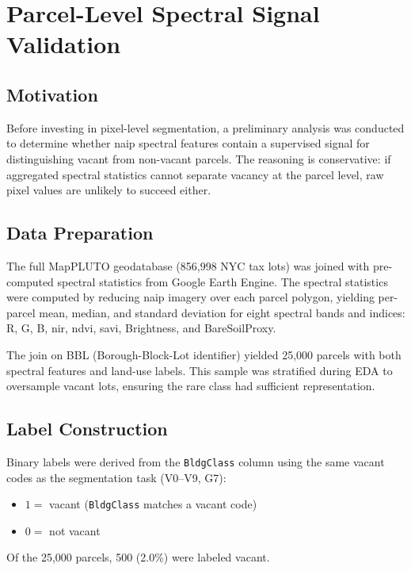 \chapter{Parcel-Level Spectral Signal Validation}
\label{appendix:spectral_signal}

\section{Motivation}

Before investing in pixel-level segmentation, a preliminary analysis was conducted to determine whether \acrshort{naip} spectral features contain a supervised signal for distinguishing vacant from non-vacant parcels. The reasoning is conservative: if aggregated spectral statistics cannot separate vacancy at the parcel level, raw pixel values are unlikely to succeed either.

\section{Data Preparation}

The full MapPLUTO geodatabase (856,998 NYC tax lots) was joined with pre-computed spectral statistics from Google Earth Engine. The spectral statistics were computed by reducing \acrshort{naip} imagery over each parcel polygon, yielding per-parcel mean, median, and standard deviation for eight spectral bands and indices: R, G, B, \acrshort{nir}, \acrshort{ndvi}, \acrshort{savi}, Brightness, and BareSoilProxy.

The join on BBL (Borough-Block-Lot identifier) yielded 25,000 parcels with both spectral features and land-use labels. This sample was stratified during EDA to oversample vacant lots, ensuring the rare class had sufficient representation.

\section{Label Construction}

Binary labels were derived from the \texttt{BldgClass} column using the same vacant codes as the segmentation task (V0--V9, G7):
\begin{itemize}
  \item $1 =$ vacant (\texttt{BldgClass} matches a vacant code)
  \item $0 =$ not vacant
\end{itemize}
Of the 25,000 parcels, 500 (2.0\%) were labeled vacant.

